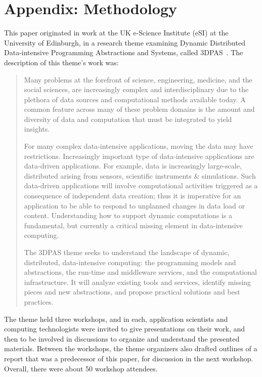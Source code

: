 


\appendix
\section*{Appendix: Methodology}

This paper originated in work at the UK e-Science Institute (eSI) at
the University of Edinburgh, in a research theme examining Dynamic
Distributed Data-intensive Programming Abstractions and Systems,
called 3DPAS~\cite{3dpas-theme}.  The description of
this theme's work was:

\begin{quote}
Many problems at the forefront of science, engineering, medicine, and the social sciences, are increasingly complex and interdisciplinary due to the plethora of data sources and computational methods available today. A common feature across many of these problem domains is the amount and diversity of data and computation that must be integrated to yield insights.

For many complex data-intensive applications, moving the data may have restrictions. Increasingly important type of data-intensive applications are data-driven applications. For example, data is increasingly large-scale, distributed arising from sensors, scientific instruments \& simulations. Such data-driven applications will involve computational activities triggered as a consequence of independent data creation; thus it is imperative for an application to be able to respond to unplanned changes in data load or content. Understanding how to support dynamic computations is a fundamental, but currently a critical missing element in data-intensive computing.

The 3DPAS theme seeks to understand the landscape of dynamic, distributed, data-intensive computing: the programming models and abstractions, the run-time and middleware services, and the computational infrastructure. It will analyze existing tools and services, identify missing pieces and new abstractions, and propose practical solutions and best practices.
\end{quote}

The theme held three workshops, and in each, application scientists and computing technologists
were invited to give presentations on their work, and then to be involved in discussions to
organize and understand the presented materials.  Between the workshops, the theme
organizers also drafted outlines of a report that was a predecessor of this paper, for
discussion in the next workshop.  Overall, there were about 50 workshop attendees.

